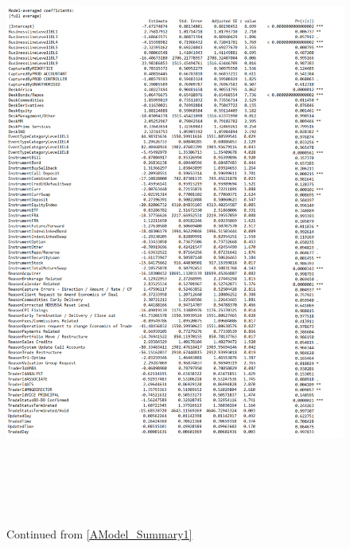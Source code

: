 \documentclass{DissertateUSU}
\begin{document}
\begin{figure}
\centering
\includegraphics[height=20cm, width=15cm]{Get_models_bin2.pdf}
\caption[Poisson GLM Amodel summary statistics]{Continued from \ref{AModel_Summary1}}
\label{AModel_Summary2}
\end{figure}
\end{document}
